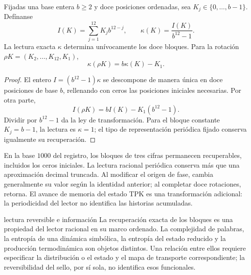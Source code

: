 \begin{proposition}
Fijadas una base entera $b\ge2$ y doce posiciones ordenadas, sea
$K_j\in\{0,\ldots,b-1\}$. Defínanse
\[
 I(K)=\sum_{j=1}^{12}K_jb^{12-j},\qquad
 \kappa(K)=\frac{I(K)}{b^{12}-1}.
\]
La lectura exacta $\kappa$ determina unívocamente los doce bloques.
Para la rotación $\rho K=(K_2,\ldots,K_{12},K_1)$,
\[
 \boxed{\kappa(\rho K)=b\kappa(K)-K_1.}
\]
\end{proposition}
\begin{proof}
El entero $I=(b^{12}-1)\kappa$ se descompone de manera única en doce
posiciones de base $b$, rellenando con ceros las posiciones iniciales
necesarias. Por otra parte,
\[
 I(\rho K)=bI(K)-K_1(b^{12}-1).
\]
Dividir por $b^{12}-1$ da la ley de transformación. Para el bloque
constante $K_j=b-1$, la lectura es $\kappa=1$; el tipo de representación
periódica fijado conserva igualmente su recuperación.
\end{proof}

En la base $1000$ del registro, los bloques de tres cifras permanecen
recuperables, incluidos los ceros iniciales. La lectura racional
periódica conserva más que una aproximación decimal truncada.
Al modificar el origen de fase, cambia generalmente su valor según
la identidad anterior; al completar doce rotaciones, retorna.
El avance de memoria del estado TPK es una transformación adicional:
la periodicidad del lector no identifica las historias acumuladas.

\begin{apunte}{lectura reversible e información}
La recuperación exacta de los bloques es una propiedad del lector
racional en su marco ordenado. La complejidad de palabras, la entropía
de una dinámica simbólica, la entropía del estado reducido y la
producción termodinámica son objetos distintos. Una relación entre
ellos requiere especificar la distribución o el estado y el mapa de
transporte correspondiente; la reversibilidad del sello, por sí sola,
no identifica esos funcionales.
\end{apunte}


